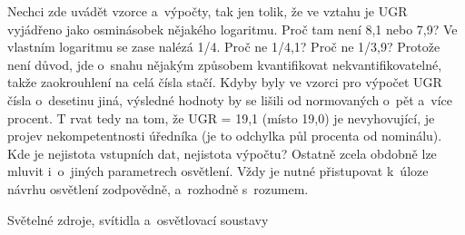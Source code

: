 Nechci zde uvádět vzorce a~výpočty, tak jen tolik, že ve vztahu je UGR vyjádřeno jako osminásobek
nějakého logaritmu. Proč tam není 8,1 nebo 7,9? Ve vlastním logaritmu se zase nalézá 1/4.
Proč ne 1/4,1? Proč ne 1/3,9? Protože není důvod, jde o~snahu nějakým způsobem kvantifikovat
nekvantifikovatelné, takže zaokrouhlení na celá čísla stačí. Kdyby byly ve vzorci pro výpočet
UGR čísla o~desetinu jiná, výsledné hodnoty by se lišili od normovaných o~pět a~více procent. T
rvat tedy na tom, že UGR = 19,1 (místo 19,0) je nevyhovující, je projev nekompetentnosti úředníka
(je to odchylka půl procenta od nominálu). Kde je nejistota vstupních dat, nejistota výpočtu?
Ostatně zcela obdobně lze mluvit i~o~jiných parametrech osvětlení. Vždy je nutné přistupovat
k~úloze návrhu osvětlení zodpovědně, a~rozhodně s~rozumem.

\sec Světelné zdroje, svítidla a~osvětlovací soustavy

